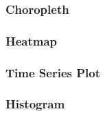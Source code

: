 \begin{frame}
  \frametitle{Choropleth}
  
  
\end{frame}

\begin{frame}
  \frametitle{Heatmap}
  

\end{frame}

\begin{frame}
  \frametitle{Time Series Plot}
  

\end{frame}

\begin{frame}
  \frametitle{Histogram}
  

\end{frame}
